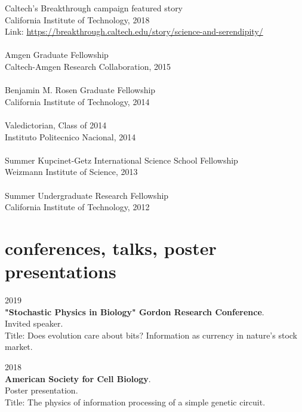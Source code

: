 \documentclass[]{friggeri-cv}
\begin{document}
Caltech's Breakthrough campaign featured story\\
{California Institute of Technology, 2018}\\
Link: \url{https://breakthrough.caltech.edu/story/science-and-serendipity/}\\
\\
Amgen Graduate Fellowship\\
{Caltech-Amgen Research Collaboration, 2015}\\
\\
Benjamin M. Rosen Graduate Fellowship\\
{California Institute of Technology, 2014}\\
\\
Valedictorian, Class of 2014\\
{Instituto Politecnico Nacional, 2014}\\
\\
Summer Kupcinet-Getz International Science School Fellowship\\
{Weizmann Institute of Science, 2013}\\
\\
Summer Undergraduate Research Fellowship\\
{California Institute of Technology, 2012}\\

\pagebreak

\section{conferences, talks, poster presentations}

{\small{} 2019}\\
\textbf{"Stochastic Physics in Biology" Gordon Research Conference}.\\
{Invited speaker.}\\
Title: Does evolution care about bits? Information as currency in nature's stock market.

{\small{} 2018}\\
\textbf{American Society for Cell Biology}.\\
{Poster presentation.}\\
Title: The physics of information processing of a simple genetic circuit.
\end{document}
